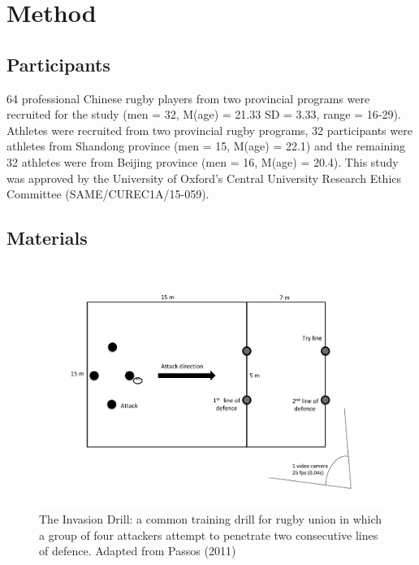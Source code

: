 \clearpage
\section{Method}

\subsection{Participants}
64 professional Chinese rugby players from two provincial programs were recruited for the study (men = 32, M(age) = 21.33 SD = 3.33, range = 16-29).  Athletes were recruited from two provincial rugby programs, 32
participants were athletes from Shandong province (men = 15, M(age) = 22.1) and the remaining 32 athletes were from Beijing province (men = 16, M(age) = 20.4).  This study was approved by the University of Oxford’s Central University Research Ethics Committee (SAME/CUREC1A/15-059).


\subsection{Materials}


\begin{figure}[htbp]
  \centering
      \includegraphics[width=0.9\linewidth,keepaspectratio] {images/invasionDrill}
      \caption{The Invasion Drill: a common training drill for rugby union in which a group of four attackers attempt to penetrate two consecutive lines of defence. Adapted from Passos (2011)}
      \label{fig:invasionDrill}
  \end{figure}



